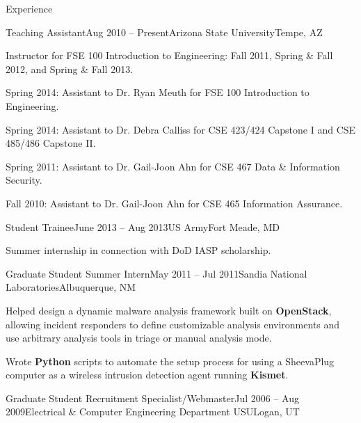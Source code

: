 \documentclass{resume} %
\begin{document}
\begin{rSection}{Experience}
\begin{rSubsection}{Teaching Assistant}{Aug 2010 -- Present}{Arizona State University}{Tempe, AZ}
	\item Instructor for FSE 100 Introduction to Engineering: Fall 2011, Spring \& Fall 2012, and Spring \& Fall 2013.

	\item Spring 2014: Assistant to Dr. Ryan Meuth for FSE 100 Introduction to Engineering.
	
	\item Spring 2014: Assistant to Dr. Debra Calliss for CSE 423/424 Capstone I and CSE 485/486 Capstone II.
	
	\item Spring 2011: Assistant to Dr. Gail-Joon Ahn for CSE 467 Data \& Information Security.
	
	\item Fall 2010: Assistant to Dr. Gail-Joon Ahn for CSE 465 Information Assurance.
	
\end{rSubsection}


\begin{rSubsection}{Student Trainee}{June 2013 -- Aug 2013}{US Army}{Fort Meade, MD}


	\item Summer internship in connection with DoD IASP scholarship.

\end{rSubsection}


\begin{rSubsection}{Graduate Student Summer Intern}{May 2011 -- Jul 2011}{Sandia National Laboratories}{Albuquerque, NM}

	\item Helped design a dynamic malware analysis framework built on \textbf{OpenStack}, allowing incident responders to define customizable analysis environments and use arbitrary analysis tools in triage or manual analysis mode.
	
	\item Wrote \textbf{Python} scripts to automate the setup process for using a SheevaPlug computer as a wireless intrusion detection agent running \textbf{Kismet}.

\end{rSubsection}


\begin{rSubsection}{Graduate Student Recruitment Specialist/Webmaster}{Jul 2006 -- Aug 2009}{Electrical \& Computer Engineering Department USU}{Logan, UT}


\end{rSubsection}
\end{rSection}
\end{document}
